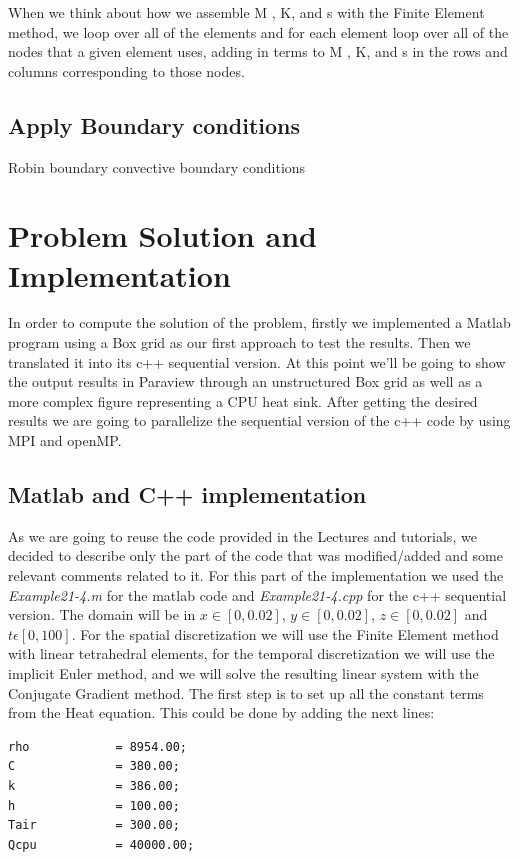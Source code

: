 \documentclass[12pt]{article}
\begin{document}
When we think about how we assemble M , K, and s with the Finite Element method, we loop over all of the elements and for each element loop over all of the nodes that a given element uses, adding in terms to M , K, and s in the rows and columns corresponding to those nodes.

\subsection{Apply Boundary conditions}

Robin boundary convective boundary conditions

\section{Problem Solution and Implementation}

In order to compute the solution of the problem, firstly we implemented a Matlab program using a Box grid as our first approach to test the results. Then we translated it into its c++ sequential version. At this point we'll be going to show the output results in Paraview through an unstructured Box grid as well as a more complex figure representing a CPU heat sink. After getting the desired results we are going to parallelize the sequential version of the c++ code by using MPI and openMP.

\subsection{Matlab and C++ implementation}
As we are going to reuse the code provided in the Lectures and tutorials, we decided to describe only the part of the code that was modified/added and some relevant comments related to it. For this part of the implementation we used the \textit{Example21-4.m} for the matlab code and \textit{Example21-4.cpp} for the c++ sequential version. The domain will be in $x\in[0,0.02]$, $y\in[0,0.02]$, $z\in[0,0.02]$ and $t\epsilon[0,100]$. For the spatial discretization we will use the Finite Element method with linear tetrahedral elements, for the temporal discretization we will use the implicit Euler method, and we will solve the resulting linear system with the Conjugate Gradient method. The first step is to set up all the constant terms from the Heat equation. This could be done by adding the next lines:

\begin{lstlisting}
rho            = 8954.00;
C              = 380.00;
k              = 386.00;
h              = 100.00;
Tair           = 300.00;
Qcpu           = 40000.00;
\end{lstlisting}
\end{document}
